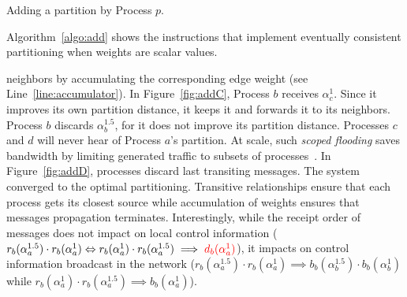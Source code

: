 \begin{algorithm}
  
  \caption{\label{algo:add}Adding a partition by Process $p$.}
\end{algorithm}

Algorithm~\ref{algo:add} shows the instructions that implement
eventually consistent partitioning when weights are scalar values.




neighbors by accumulating the corresponding edge weight (see
Line~\ref{line:accumulator}). In Figure~\ref{fig:addC}, Process $b$
receives $\alpha_{c}^{1}$. Since it improves its own partition
distance, it keeps it and forwards it to its neighbors. Process $b$
discards $\alpha_{b}^{1.5}$, for it does not improve its partition
distance. Processes $c$ and $d$ will never hear of Process $a$'s
partition. At scale, such \emph{scoped flooding} saves bandwidth by
limiting generated traffic to subsets of
processes~\cite{wang2015prodiluvian}. In Figure~\ref{fig:addD},
processes discard last transiting messages. The system converged to
the optimal partitioning.  Transitive relationships ensure that each
process gets its closest source while accumulation of weights ensures
that messages propagation terminates.  Interestingly, while the
receipt order of messages does not impact on local control information
($r_b(\alpha_a^{1.5}) \cdot r_b(\alpha_a^{1}) \Leftrightarrow
r_b(\alpha_a^{1}) \cdot r_b(\alpha_a^{1.5}) \implies
\textcolor{red}{d_b(\alpha_a^{1})}$), it impacts on control information
broadcast in the network ($r_b(\alpha_a^{1.5}) \cdot r_b(\alpha_a^{1})
\implies b_b(\alpha_{b}^{1.5}) \cdot b_b(\alpha_{b}^{1})$ while
$r_b(\alpha_a^{1}) \cdot r_b(\alpha_a^{1.5}) \implies
b_b(\alpha_a^{1})$).

